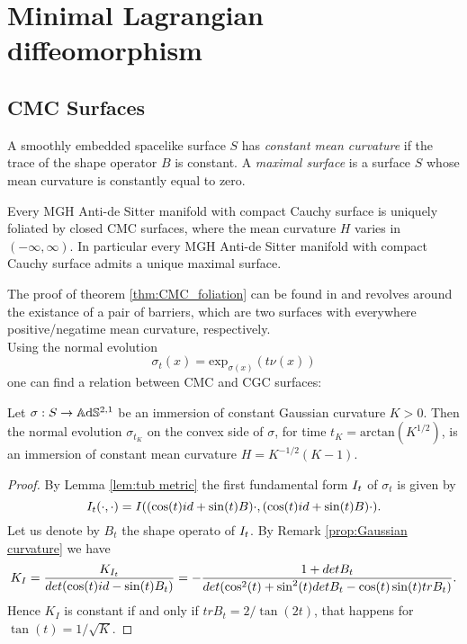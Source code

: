 \chapter{Minimal Lagrangian diffeomorphism}



\section{CMC Surfaces}
A smoothly embedded spacelike surface $S$ has \textit{constant mean curvature} if the trace of the shape operator $B$ is constant. A \textit{maximal surface} is a surface $S$ whose mean curvature is constantly equal to zero.
\begin{theorem}\label{thm:CMC_foliation}
    Every MGH Anti-de Sitter manifold with compact Cauchy surface is uniquely foliated by closed CMC surfaces, where the mean curvature $H$ varies in $(-\infty,\infty)$. In particular every MGH Anti-de Sitter manifold with compact Cauchy surface admits a unique maximal surface.
\end{theorem}
The proof of theorem \ref{thm:CMC_foliation} can be found in \cite{barbot2004constant} and revolves around the existance of a pair of barriers, which are two surfaces with everywhere positive/negatime mean curvature, respectively.\\
Using the normal evolution
\[
    \sigma_t(x) = \text{exp}_{\sigma(x)} (t\nu(x))
\]
one can find a relation between CMC and CGC surfaces:
\begin{proposition}
    Let $\sigma: S \to\mathbb{A}\mathrm{d}\mathbb{S}^{2,1}$ be an immersion of constant Gaussian curvature $K>0$. Then the normal evolution $\sigma_{t_K}$ on the convex side of $\sigma$, for time $t_K=\text{arctan}(K^{1/2})$, is an immersion of constant mean curvature $H=K^{-1/2}(K-1)$.
\end{proposition}
\begin{proof}
    By Lemma \ref{lem:tub metric} the first fundamental form $I_t$ of $\sigma_t$ is given by
    \[
        I_t(\cdot, \cdot) = I((\cos(t)id + \sin(t)B)\cdot, (\cos(t)id + \sin(t)B)\cdot).
    \]
    Let us denote by $B_t$ the shape operato of $I_t$. By Remark \ref{prop:Gaussian curvature} we have
    \[
        K_I = \frac{K_{I_t}}{det(\cos(t)id - \sin(t)B_t)} = - \frac{1+detB_t}{det(\cos^2(t) + \sin^2(t)det B_t -\cos(t) \sin(t)tr B_t)}.
    \]
    Hence $K_I$ is constant if and only if $tr B_t = 2/ \tan(2t)$, that happens for $\tan(t) = 1 / \sqrt{K}$.
\end{proof}

